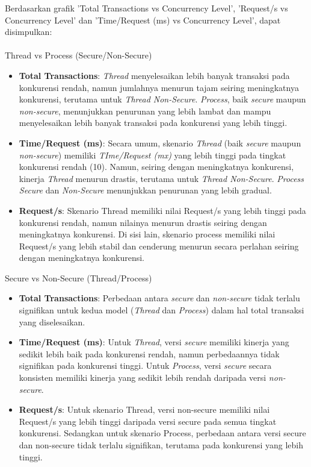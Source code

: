 \documentclass[12pt]{article}
\begin{document}
\newpage
Berdasarkan grafik 'Total Transactions vs Concurrency Level', 'Request/s vs Concurrency Level' dan 'Time/Request (ms) vs Concurrency Level', dapat disimpulkan:
\\\\
Thread vs Process (Secure/Non-Secure)
\begin{itemize}
    \item \textbf{Total Transactions}: \textit{Thread} menyelesaikan lebih banyak transaksi pada konkurensi rendah, namun jumlahnya menurun tajam seiring meningkatnya konkurensi, terutama untuk \textit{Thread Non-Secure}. \textit{Process}, baik \textit{secure} maupun \textit{non-secure}, menunjukkan penurunan yang lebih lambat dan mampu menyelesaikan lebih banyak transaksi pada konkurensi yang lebih tinggi.
    \item \textbf{Time/Request (ms)}: Secara umum, skenario \textit{Thread} (baik \textit{secure} maupun \textit{non-secure}) memiliki \textit{TIme/Request (mx)} yang lebih tinggi pada tingkat konkurensi rendah (10). Namun, seiring dengan meningkatnya konkurensi, kinerja \textit{Thread} menurun drastis, terutama untuk \textit{Thread Non-Secure}. \textit{Process Secure} dan \textit{Non-Secure} menunjukkan penurunan yang lebih gradual.
    \item \textbf{Request/s}: Skenario Thread memiliki nilai Request/s yang lebih tinggi pada konkurensi rendah, namun nilainya menurun drastis seiring dengan meningkatnya konkurensi. Di sisi lain, skenario process memiliki nilai Request/s yang lebih stabil dan cenderung menurun secara perlahan seiring dengan meningkatnya konkurensi.
\end{itemize}
Secure vs Non-Secure (Thread/Process)
\begin{itemize}
    \item \textbf{Total Transactions}: Perbedaan antara \textit{secure} dan \textit{non-secure} tidak terlalu signifikan untuk kedua model (\textit{Thread} dan \textit{Process}) dalam hal total transaksi yang diselesaikan.
    \item \textbf{Time/Request (ms)}: Untuk \textit{Thread}, versi \textit{secure} memiliki kinerja yang sedikit lebih baik pada konkurensi rendah, namun perbedaannya tidak signifikan pada konkurensi tinggi. Untuk \textit{Process}, versi \textit{secure} secara konsisten memiliki kinerja yang sedikit lebih rendah daripada versi \textit{non-secure}.
    \item \textbf{Request/s}: Untuk skenario Thread, versi non-secure memiliki nilai Request/s yang lebih tinggi daripada versi secure pada semua tingkat konkurensi. Sedangkan untuk skenario Process, perbedaan antara versi secure dan non-secure tidak terlalu signifikan, terutama pada konkurensi yang lebih tinggi.
\end{itemize}
\end{document}
